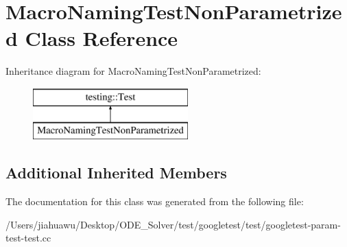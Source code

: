 \hypertarget{class_macro_naming_test_non_parametrized}{}\section{Macro\+Naming\+Test\+Non\+Parametrized Class Reference}
\label{class_macro_naming_test_non_parametrized}
Inheritance diagram for Macro\+Naming\+Test\+Non\+Parametrized\+:\begin{figure}[H]
\begin{center}
\leavevmode
\includegraphics[height=2.000000cm]{class_macro_naming_test_non_parametrized}
\end{center}
\end{figure}
\subsection*{Additional Inherited Members}


The documentation for this class was generated from the following file\+:\begin{DoxyCompactItemize}
\item 
/\+Users/jiahuawu/\+Desktop/\+O\+D\+E\+\_\+\+Solver/test/googletest/test/googletest-\/param-\/test-\/test.\+cc\end{DoxyCompactItemize}
